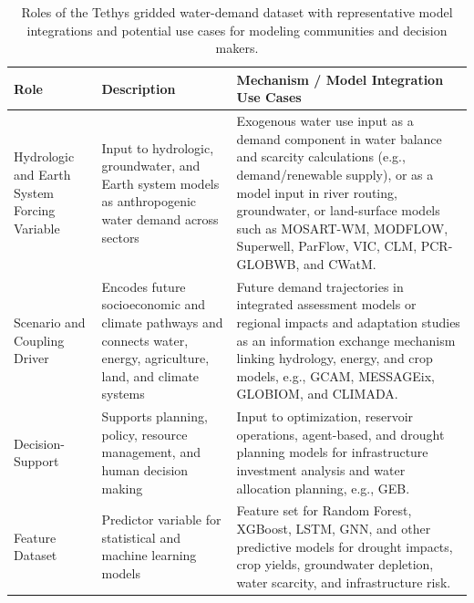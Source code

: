 \documentclass[fleqn,10pt]{wlscirep}
\begin{document}
\begin{table}[!ht]
\centering
\small
\begin{tabular}{p{3.2cm} p{4.5cm} p{8.4cm}}
\hline
\textbf{Role} & \textbf{Description} & \textbf{Mechanism / Model Integration Use Cases} \\
\hline

Hydrologic and Earth System Forcing Variable &
Input to hydrologic, groundwater, and Earth system models as anthropogenic water demand across sectors &
Exogenous water use input as a demand component in water balance and scarcity calculations (e.g., demand/renewable supply), or as a model input in river routing, groundwater, or land-surface models such as MOSART-WM\cite{hess-17-4555-2013}, MODFLOW\cite{modflow6}, Superwell\cite{superwell}, ParFlow\cite{parflow}, VIC\cite{vic}, CLM\cite{clm5}, PCR-GLOBWB\cite{pcrglobwb}, and CWatM\cite{cwatm}. \\

Scenario and Coupling Driver &
Encodes future socioeconomic and climate pathways and connects water, energy, agriculture, land, and climate systems &
Future demand trajectories in integrated assessment models or regional impacts and adaptation studies as an information exchange mechanism linking hydrology, energy, and crop models, e.g., GCAM\cite{Calvin2019GCAM}, MESSAGEix\cite{messageix}, GLOBIOM\cite{globiom}, and CLIMADA\cite{climada}. \\

Decision-Support &
Supports planning, policy, resource management, and human decision making &
Input to optimization, reservoir operations, agent-based, and drought planning models for infrastructure investment analysis and water allocation planning, e.g., GEB\cite{geb}. \\

Feature Dataset &
Predictor variable for statistical and machine learning models &
Feature set for Random Forest, XGBoost, LSTM, GNN, and other predictive models for drought impacts, crop yields, groundwater depletion, water scarcity, and infrastructure risk. \\

\hline
\end{tabular}
\caption{Roles of the Tethys gridded water-demand dataset with representative model integrations and potential use cases for modeling communities and decision makers.}
\label{tab:water_demand_roles}
\end{table}

\end{document}
